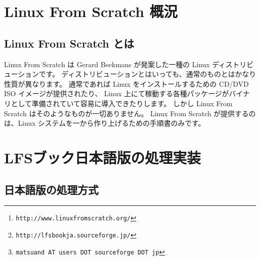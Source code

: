 \documentclass{lfsread}
\begin{document}
\author{松 山 道 夫\thanks{\texttt{matsuand AT users DOT sourceforge DOT jp}}}
\date{2013年9月xx日}
\maketitle

\begin{abstract}
Linux From Scratch は、Linux を１から作り出す手順書「LFSブック」を提供するプロジェクトです%
\footnote{\texttt{http://www.linuxfromscratch.org/}}。
著者はそのオリジナルに対する日本語訳を構築し、SourceForge サイト%
\footnote{\texttt{http://lfsbookja.sourceforge.jp/}}
において公開しています。
本書では、LFSブックのこと、著者の利用状況などについてや、日本語訳を行う際の訳出術について、
また日本語版を生成するための処理段取りなどについて、取りとめもなく語ります。
\end{abstract}

\section{Linux From Scratch 概況}

\subsection{Linux From Scratch とは}

Linux From Scratch は Gerard Beekmans が発案した一種の Linux ディストリビューションです。
ディストリビューションとはいっても、通常のものとはかなり性質が異なります。
通常であれば Linux をインストールするための CD/DVD ISO イメージが提供されたり、
Linux 上にて稼動する各種パッケージがバイナリとして準備されていて容易に導入できたりします。
しかし Linux From Scratch はそのようなものが一切ありません。
Linux From Scratch が提供するのは、Linux システムを一から作り上げるための手順書のみです。




\section{LFSブック日本語版の処理実装}

\subsection{日本語版の処理方式}
\end{document}
